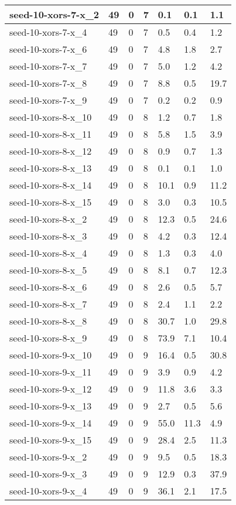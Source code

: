 \begin{scriptsize}
\begin{longtable}{|p{5cm}|l|l|l|l|l|l|}
seed-10-xors-7-x\_2&49&0&7&0.1&0.1&1.1 \\ \hline 
seed-10-xors-7-x\_4&49&0&7&0.5&0.4&1.2 \\ \hline 
seed-10-xors-7-x\_6&49&0&7&4.8&1.8&2.7 \\ \hline 
seed-10-xors-7-x\_7&49&0&7&5.0&1.2&4.2 \\ \hline 
seed-10-xors-7-x\_8&49&0&7&8.8&0.5&19.7 \\ \hline 
seed-10-xors-7-x\_9&49&0&7&0.2&0.2&0.9 \\ \hline 
seed-10-xors-8-x\_10&49&0&8&1.2&0.7&1.8 \\ \hline 
seed-10-xors-8-x\_11&49&0&8&5.8&1.5&3.9 \\ \hline 
seed-10-xors-8-x\_12&49&0&8&0.9&0.7&1.3 \\ \hline 
seed-10-xors-8-x\_13&49&0&8&0.1&0.1&1.0 \\ \hline 
seed-10-xors-8-x\_14&49&0&8&10.1&0.9&11.2 \\ \hline 
seed-10-xors-8-x\_15&49&0&8&3.0&0.3&10.5 \\ \hline 
seed-10-xors-8-x\_2&49&0&8&12.3&0.5&24.6 \\ \hline 
seed-10-xors-8-x\_3&49&0&8&4.2&0.3&12.4 \\ \hline 
seed-10-xors-8-x\_4&49&0&8&1.3&0.3&4.0 \\ \hline 
seed-10-xors-8-x\_5&49&0&8&8.1&0.7&12.3 \\ \hline 
seed-10-xors-8-x\_6&49&0&8&2.6&0.5&5.7 \\ \hline 
seed-10-xors-8-x\_7&49&0&8&2.4&1.1&2.2 \\ \hline 
seed-10-xors-8-x\_8&49&0&8&30.7&1.0&29.8 \\ \hline 
seed-10-xors-8-x\_9&49&0&8&73.9&7.1&10.4 \\ \hline 
seed-10-xors-9-x\_10&49&0&9&16.4&0.5&30.8 \\ \hline 
seed-10-xors-9-x\_11&49&0&9&3.9&0.9&4.2 \\ \hline 
seed-10-xors-9-x\_12&49&0&9&11.8&3.6&3.3 \\ \hline 
seed-10-xors-9-x\_13&49&0&9&2.7&0.5&5.6 \\ \hline 
seed-10-xors-9-x\_14&49&0&9&55.0&11.3&4.9 \\ \hline 
seed-10-xors-9-x\_15&49&0&9&28.4&2.5&11.3 \\ \hline 
seed-10-xors-9-x\_2&49&0&9&9.5&0.5&18.3 \\ \hline 
seed-10-xors-9-x\_3&49&0&9&12.9&0.3&37.9 \\ \hline 
seed-10-xors-9-x\_4&49&0&9&36.1&2.1&17.5 \\ \hline 

\end{longtable}
\end{scriptsize}
